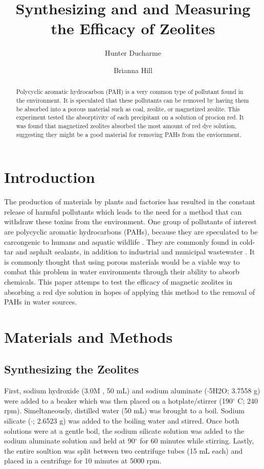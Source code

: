\documentclass[11pt]{article} %
\title{Synthesizing and and Measuring the Efficacy of Zeolites}
\author[*]{Hunter Ducharme}
\author[ ]{Brianna Hill}
\affil[*]{Primary author}
\date{} %
\begin{document}
\maketitle

\begin{abstract}
Polycyclic aromatic hydrocarbon (PAH) is a very common type of pollutant found in the environment. It is speculated that these pollutants can be removed by having them be absorbed into a porous material such as coal, zeolite, or magnetized zeolite. This experiment tested the absorptivity of each precipitant on a solution of procion red. It was found that magnetized zeolites absorbed the most amount of red dye solution, suggesting they might be a good material for removing PAHs from the enviornment.
\end{abstract}

\section{Introduction}
The production of materials by plants and factories has resulted in the constant release of harmful pollutants which leads to the need for a method that can withdraw these toxins from the environment. One group of pollutants of interest are polycyclic aromatic hydrocarbons (PAHs), because they are speculated to be carcongenic to humans and aquatic wildlife \cite{PAH}. They are commonly found in cold-tar and asphalt sealants, in addition to industrial and municipal wastewater \cite{Southworth1979}. It is commonly thought that using porous materials would be a viable way to combat this problem in water environments through their ability to absorb chemicals. This paper attemps to test the efficacy of magnetic zeolites in absorbing a red dye solution in hopes of applying this method to the removal of PAHs in water sources.

\section{Materials and Methods}

\subsection{Synthesizing the Zeolites}
First, sodium hydroxide (3.0M , 50 mL) and sodium aluminate ($\cdot${5H2O}; 3.7558 g) were added to a beaker which was then placed on a hotplate/stirrer (190$^{\circ}$ C; 240 rpm). Simeltaneously, distilled water (50 mL) was brought to a boil. Sodium silicate ($\cdot$; 2.6523 g) was added to the boiling water and stirred. Once both solutions were at a gentle boil, the sodium silicate solution was added to the sodium aluminate solution and held at 90$^{\circ}$ for 60 minutes while stirring. Lastly, the entire soultion was split between two centrifuge tubes (\large 15 mL each) and placed in a centrifuge for 10 minutes at 5000 rpm.
\end{document}
